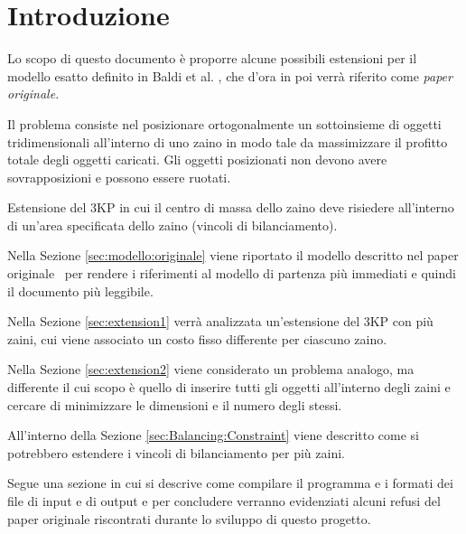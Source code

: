 \section{Introduzione}
Lo scopo di questo documento è proporre alcune possibili estensioni per il 
modello esatto definito in Baldi et al. \cite{Baldi20129802}, 
che d'ora in poi verrà riferito come \emph{paper originale}.

\begin{problem}[3KP]
Il problema consiste nel posizionare ortogonalmente un sottoinsieme di 
oggetti tridimensionali all'interno di uno zaino in modo tale da 
massimizzare il profitto totale degli oggetti caricati. 
Gli oggetti posizionati non devono avere sovrapposizioni e possono 
essere ruotati.
\end{problem}

\begin{problem}[3BKP]
Estensione del 3KP in cui il centro di massa dello zaino deve risiedere
all'interno di un'area specificata dello zaino (vincoli di bilanciamento).
\end{problem}

Nella Sezione \ref{sec:modello:originale} viene riportato il modello descritto 
nel paper originale~\cite{Baldi20129802} per rendere i riferimenti al modello
di partenza più immediati e quindi il documento più leggibile.

Nella Sezione \ref{sec:extension1} verrà analizzata un'estensione del 3KP con 
più zaini, cui viene associato un costo fisso differente per ciascuno zaino.

Nella Sezione \ref{sec:extension2} viene considerato un problema analogo, 
ma differente il cui scopo è quello di inserire tutti gli oggetti all'interno 
degli zaini e cercare di minimizzare le dimensioni e il numero degli stessi. 

All'interno della Sezione \ref{sec:Balancing:Constraint} viene descritto come 
si potrebbero estendere i vincoli di bilanciamento per più zaini. 


Segue una sezione in cui si descrive come compilare il programma e i formati dei
file di input e di output e per concludere verranno evidenziati alcuni refusi 
del paper originale riscontrati durante lo sviluppo di questo progetto.

